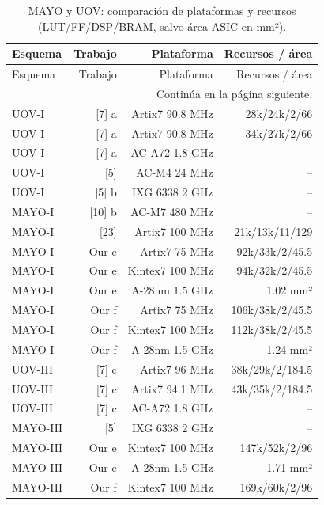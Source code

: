 \begingroup
\small
\setlength{\tabcolsep}{3pt}
\setlength{\LTcapwidth}{\textwidth}
\begin{longtable}{lrrr}
\caption{MAYO y UOV: comparación de plataformas y recursos (LUT/FF/DSP/BRAM, salvo área ASIC en mm²).}\label{tab:eval-mayo-recursos}\\
\toprule
Esquema & Trabajo & Plataforma & Recursos / área \\
\midrule
\endfirsthead
\toprule
Esquema & Trabajo & Plataforma & Recursos / área \\
\midrule
\endhead
\midrule
\multicolumn{4}{r}{\small Continúa en la página siguiente.}\\
\endfoot
\bottomrule
\endlastfoot
{UOV-I} & {[7] a} & {Artix7 90.8 MHz} & {28k/24k/2/66} \\
{UOV-I} & {[7] a} & {Artix7 90.8 MHz} & {34k/27k/2/66} \\
{UOV-I} & {[7] a} & {AC-A72 1.8 GHz} & {--} \\
{UOV-I} & {[5]} & {AC-M4 24 MHz} & {--} \\
{UOV-I} & {[5] b} & {IXG 6338 2 GHz} & {--} \\
{MAYO-I} & {[10] b} & {AC-M7 480 MHz} & {--} \\
{MAYO-I} & {[23]} & {Artix7 100 MHz} & {21k/13k/11/129} \\
{MAYO-I} & {Our e} & {Artix7 75 MHz} & {92k/33k/2/45.5} \\
{MAYO-I} & {Our e} & {Kintex7 100 MHz} & {94k/32k/2/45.5} \\
{MAYO-I} & {Our e} & {A-28nm 1.5 GHz} & {1.02 mm²} \\
{MAYO-I} & {Our f} & {Artix7 75 MHz} & {106k/38k/2/45.5} \\
{MAYO-I} & {Our f} & {Kintex7 100 MHz} & {112k/38k/2/45.5} \\
{MAYO-I} & {Our f} & {A-28nm 1.5 GHz} & {1.24 mm²} \\
{UOV-III} & {[7] c} & {Artix7 96 MHz} & {38k/29k/2/184.5} \\
{UOV-III} & {[7] c} & {Artix7 94.1 MHz} & {43k/35k/2/184.5} \\
{UOV-III} & {[7] c} & {AC-A72 1.8 GHz} & {--} \\
{MAYO-III} & {[5]} & {IXG 6338 2 GHz} & {--} \\
{MAYO-III} & {Our e} & {Kintex7 100 MHz} & {147k/52k/2/96} \\
{MAYO-III} & {Our e} & {A-28nm 1.5 GHz} & {1.71 mm²} \\
{MAYO-III} & {Our f} & {Kintex7 100 MHz} & {169k/60k/2/96} \\

\end{longtable}
